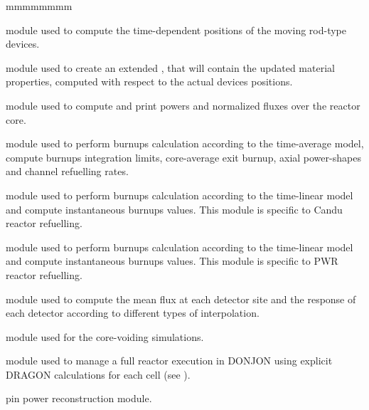 \begin{ListeDeDescription}{mmmmmmmm}
\item[\moc{MOVDEV:}] module used to compute the time-dependent
positions of the moving rod-type devices.

\item[\moc{NEWMAC:}] module used to create an extended ,
that will contain the updated material properties, computed with respect to
the actual devices positions.

\item[\moc{FLPOW:}] module used to compute and print powers
and normalized fluxes over the reactor core.

\item[\moc{TAVG:}] module used to perform burnups calculation
according to the time-average model, compute burnups integration
limits, core-average exit burnup, axial power-shapes and channel
refuelling rates.

\item[\moc{TINST:}] module used to perform burnups calculation
according to the time-linear model and compute instantaneous burnups
values. This module is specific to Candu reactor refuelling.

\item[\moc{SIM:}] module used to perform burnups calculation
according to the time-linear model and compute instantaneous burnups
values. This module is specific to PWR reactor refuelling.

\item[\moc{DETECT:}]  module used to compute the mean flux at each detector site
and the response of each detector according to different types of
interpolation.

\item[\moc{CVR:}] module used for the core-voiding simulations.

\item[\moc{HST:}]  module used to manage a full reactor execution in DONJON using explicit DRAGON
calculations for each cell (see ).\cite{hst}

\item[\moc{NAP:}] pin power reconstruction module.\cite{Chambon2014,Fliscounakis2011}

\end{ListeDeDescription}
